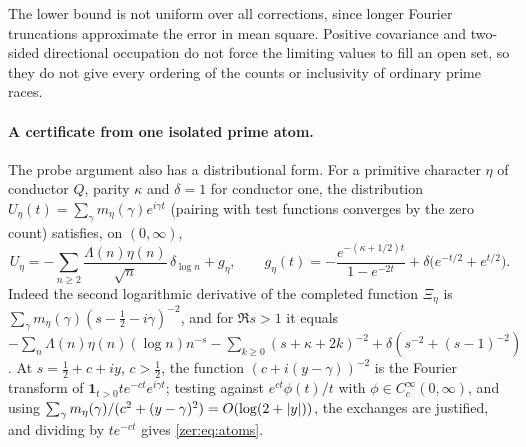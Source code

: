 The lower bound is not uniform over all corrections, since longer Fourier truncations approximate the
error in mean square. Positive covariance and two-sided directional occupation do not force the
limiting values to fill an open set, so they do not give every ordering of the counts or inclusivity
of ordinary prime races.

\paragraph{A certificate from one isolated prime atom.}
The probe argument also has a distributional form. For a primitive character $\eta$ of conductor
$Q$, parity $\kappa$ and $\delta=1$ for conductor one, the distribution
$U_\eta(t)=\sum_\gamma m_\eta(\gamma)e^{i\gamma t}$ (pairing with test functions converges by the
zero count) satisfies, on $(0,\infty)$,
\begin{equation}\label{zer:eq:atoms}
 U_\eta=-\sum_{n\ge2}\frac{\Lambda(n)\eta(n)}{\sqrt n}\,\delta_{\log n}+g_\eta,\qquad
 g_\eta(t)=-\frac{e^{-(\kappa+1/2)t}}{1-e^{-2t}}+\delta\bigl(e^{-t/2}+e^{t/2}\bigr).
\end{equation}
Indeed the second logarithmic derivative of the completed function $\Xi_\eta$ is
$\sum_\gamma m_\eta(\gamma)(s-\tfrac12-i\gamma)^{-2}$, and for $\Re s>1$ it equals
$-\sum_n\Lambda(n)\eta(n)(\log n)n^{-s}-\sum_{k\ge0}(s+\kappa+2k)^{-2}+\delta(s^{-2}+(s-1)^{-2})$.
At $s=\tfrac12+c+iy$, $c>\tfrac12$, the function $(c+i(y-\gamma))^{-2}$ is the Fourier transform of
$\mathbf 1_{t>0}te^{-ct}e^{i\gamma t}$; testing against $e^{ct}\phi(t)/t$ with
$\phi\in C_c^\infty(0,\infty)$, and using
$\sum_\gamma m_\eta(\gamma)/(c^2+(y-\gamma)^2)=O(\log(2+\lvert y\rvert))$, the exchanges are justified, and
dividing by $te^{-ct}$ gives \eqref{zer:eq:atoms}.

